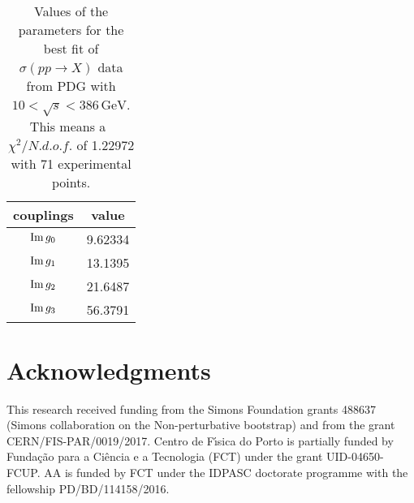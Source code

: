 \documentclass[preprint, 12pt]{elsarticle}
\begin{document}
\begin{table}[b!]
\centering
\caption{Values of the parameters for the best fit of  $\sigma\left(p p \rightarrow X\right)$ data from PDG with $10 < \sqrt{s} < 386 \, \text{GeV}$. This means a~$\chi^2 / {N.d.o.f.}$ of 1.22972 with 71 experimental points.}
\vspace{0.5cm}
\begin{tabular}{|c|c|}
\hline
couplings   & value \\
\hline
${\rm Im} \, g_0$  & 9.62334 \\ 
\hline
${\rm Im} \, g_1$  & 13.1395 \\ 
\hline
${\rm Im} \, g_2$  & 21.6487 \\
\hline
${\rm Im} \, g_3$  & 56.3791 \\ 
\hline
\end{tabular}
\label{table:SigmaProtonProton_best_fit_10_lt_W_lt_386}
\end{table}


\section{Acknowledgments}


This research received funding from the Simons Foundation grants 488637  (Simons collaboration on the Non-perturbative bootstrap)
and from the  grant CERN/FIS-PAR/0019/2017. 
Centro de F\'\i sica do Porto is partially funded by Funda\c c\~ao para a Ci\^encia e a Tecnologia (FCT) under the grant
UID-04650-FCUP.
 AA is funded by FCT under the IDPASC doctorate programme with the fellowship  PD/BD/114158/2016.



\end{document}

